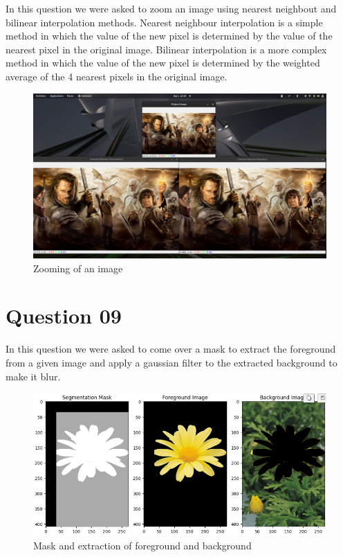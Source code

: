 \documentclass[11pt,a4paper]{article}
\begin{document}
In this question we were asked to zoom an image using nearest neighbout and bilinear interpolation methods. Nearest neighbour interpolation is a simple method in which the value of the new pixel is determined by the value of the nearest pixel in the original image. Bilinear interpolation is a more complex method in which the value of the new pixel is determined by the weighted average of the 4 nearest pixels in the original image.

\lstset{style=mystyle}



{\begin{figure}[h]
    \centering
    \includegraphics[width=1\linewidth]{images/7-4.png}
    \caption{Zooming of an image}
\end{figure}}

\section{Question 09}

In this question we were asked to come over a mask to extract the foreground from a given image and apply a gaussian filter to the extracted background to make it blur. 

\lstset{style=mystyle}


\newpage

{\begin{figure}[h]
    \centering
    \includegraphics[width=1\linewidth]{images/9-1.png}
    \caption{Mask and extraction of foreground and background}
\end{figure}}
\end{document}

